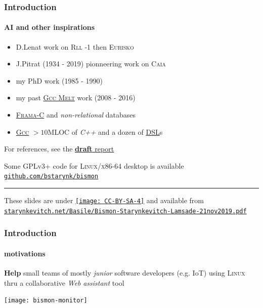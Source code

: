 \documentclass[xcolor=svgnames,final,smaller,a4]{beamer}
\begin{document}
\begin{frame}
    \frametitle{Introduction}
    \framesubtitle{AI and other inspirations}

    \begin{itemize}

    \item D.Lenat work on \textsc{Rll -1} then \textsc{Eurisko}
    \item J.Pitrat (1934 - 2019) pionneering work on \textsc{Caia}
    \item my PhD work (1985 - 1990)
    \item my past \href{http://starynkevitch.net/Basile/gcc-melt/}{\textsc{Gcc Melt}} work (2008 - 2016)
    \item \href{http://frama-c.com/}{\textsc{Frama-C}} and \textit{non-relational} databases
    \item \href{http://gcc.gnu.org/}{\textsc{Gcc}}  $> 10$MLOC of \textit{C++} {}
 and a dozen of \href{https://en.wikipedia.org/wiki/Domain-specific_language}{DSL}s
    \end{itemize}

    For references, see the \href{http://starynkevitch.net/Basile/bismon-chariot-doc.pdf}{{\Bismon} \textbf{draft} report} {}

    Some GPLv3+ code for \textsc{Linux/x86-64} desktop is available
    \href{http://github.com/bstarynk/bismon}{\texttt{github.com/bstarynk/bismon}}

    \hrule
    
    These slides are under \href{https://creativecommons.org/licenses/by-sa/4.0/}{\texttt{[image: CC-BY-SA-4]}}  and available from \href{http://starynkevitch.net/Basile/Bismon-Starynkevitch-Lamsade-21nov2019.pdf}{\texttt{starynkevitch.net/Basile/Bismon-Starynkevitch-Lamsade-21nov2019.pdf}}

    
    
\end{frame}

\begin{frame}
    \frametitle{Introduction}
    \framesubtitle{motivations}

    \textbf{Help} small teams of mostly \emph{junior} software developers (e.g. IoT) using \textsc{Linux} thru a collaborative \textit{Web} \emph{assistant} tool

    \begin{center}
      \texttt{[image: bismon-monitor]}
    \end{center}
    
\end{frame}
\end{document}
